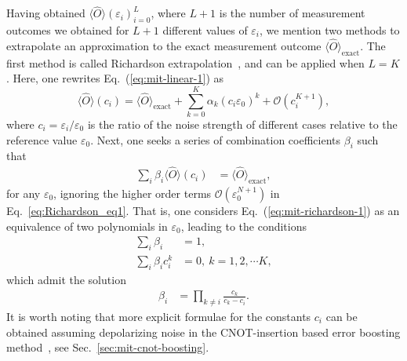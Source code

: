 Having obtained $\langle \hat{O} \rangle(\varepsilon _{i} )_{i=0}^{L}$, where $L+1$ is the number of measurement outcomes we obtained for $L+1$ different values of $\varepsilon _{i}$, we mention two methods to extrapolate an approximation to the exact measurement outcome $\langle \hat{O} \rangle_{\mathrm{exact}}$. The first method is called Richardson extrapolation~\cite{liEfficientVariationalQuantum2017,temmeErrorMitigationShortDepth2017}, and can be applied when $L=K$. Here, one rewrites Eq.~(\ref{eq:mit-linear-1}) as
\begin{equation}
    \label{eq:Richardson_eq1}
    \langle \hat{O} \rangle(c_{i} )=\langle \hat{O} \rangle_{\mathrm{exact}} +\sum _{k=0}^{K} \alpha _{k}( c_{i} \varepsilon _{0})^{k} +\mathcal{O} (c_{i}^{K+1} ),
\end{equation}
where $c_{i} =\varepsilon _{i} /\varepsilon _{0}$ is the ratio of the noise strength of different cases relative to the reference value $\varepsilon _{0}$. Next, one seeks a series of combination coefficients $\beta _{i}$ such that
\begin{equation}
    \begin{split}
        \label{eq:mit-richardson-1}
        \sum _{i} \beta _{i} \langle \hat{O} \rangle( c_{i}) & =\langle \hat{O} \rangle_{\mathrm{exact}} ,
    \end{split}
\end{equation}
for any $\varepsilon_{0}$, ignoring the higher order terms $\mathcal{O} (\varepsilon_0^{N+1} )$ in Eq.~\ref{eq:Richardson_eq1}. That is, one considers Eq.~(\ref{eq:mit-richardson-1}) as an equivalence of two polynomials in $\varepsilon _{0}$, leading to the conditions
\begin{equation}
    \begin{split}
        \sum _{i} \beta _{i} & =1,\\
        \sum _{i} \beta _{i} c_{i}^{k} & =0,\ k=1,2,\cdots K,
    \end{split}
\end{equation}
which admit the solution
\begin{equation}
    \begin{split}\label{eq:mit-poly-beta}
        \beta _{i} & =\prod _{k\neq i}\frac{c_{k}}{c_{k} - c_{i}} .
    \end{split}
\end{equation}
It is worth noting that more explicit formulae for the constants $c_i$ can be obtained assuming depolarizing noise in the CNOT-insertion based error boosting method~\cite{heResourceEfficientZero2020}, see Sec.~\ref{sec:mit-cnot-boosting}.

